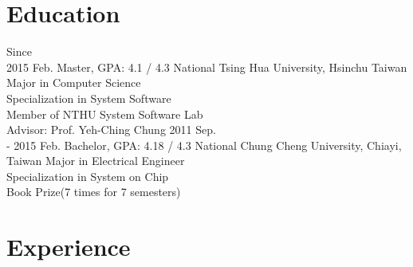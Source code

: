 \documentclass[]{friggeri-cv}
\begin{document}
\section{Education}

\begin{entrylist}
  \entry
    {Since \\
	 2015 Feb.}
    {Master, GPA: 4.1 / 4.3}
    {National Tsing Hua University, Hsinchu Taiwan}
	{Major in Computer Science \\
	Specialization in System Software \\
	Member of NTHU System Software Lab \\
	Advisor: Prof. Yeh-Ching Chung}
  \entry
    {2011 Sep. \\
	- 2015 Feb.}
    {Bachelor, GPA: 4.18 / 4.3}
    {National Chung Cheng University, Chiayi, Taiwan}
	{Major in Electrical Engineer \\
	Specialization in System on Chip \\
	Book Prize(7 times for 7 semesters)}
\end{entrylist}

\section{Experience}
\end{document}
